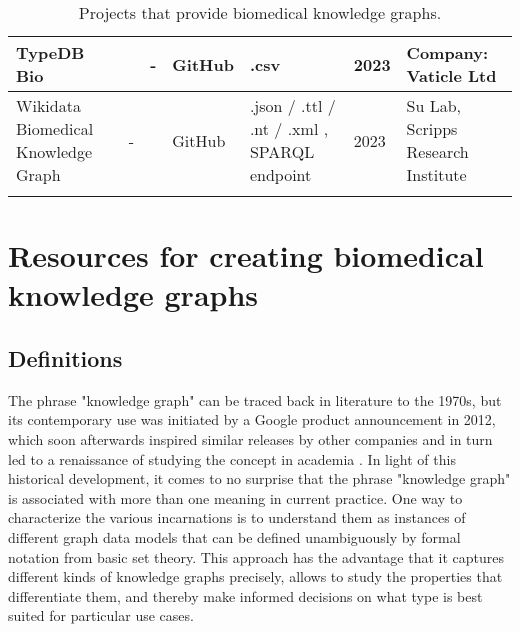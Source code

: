 \documentclass{article}
\begin{document}
\begin{landscape}
\begin{xltabular}{\textwidth}{p{3cm}|p{2.2cm}|p{2.2cm}|p{2.2cm}|p{2.2cm}|p{1cm}|p{6cm}}
\hline


TypeDB Bio
&
\cite{typedbbio_website}
&
-
&
GitHub
\cite{typedbbio_github}
&
.csv
\cite{typedbbio_data}
&
2023
&
Company: Vaticle Ltd
\cite{typedbbio_group}
\\


\hline


Wikidata Biomedical Knowledge Graph
&
-
&
\cite{wbkg_publication}
&
GitHub
\cite{wbkg_github1}
\cite{wbkg_github2}
\cite{wbkg_github3}
\cite{wbkg_github4}
\cite{wbkg_github5}
&
.json / .ttl / .nt / .xml
\cite{wbkg_data1},
SPARQL endpoint
\cite{wbkg_data2}
&
2023
&
Su Lab, Scripps Research Institute
\cite{wbkg_group}
\\


\caption{Projects that provide biomedical knowledge graphs.}
\end{xltabular}

\end{landscape}





\newpage
\section{Resources for creating biomedical knowledge graphs}
\label{sec:resources}

\subsection{Definitions}
\label{sec:definitions}

The phrase "knowledge graph" can be traced back in literature to the 1970s, but its contemporary use was initiated by a Google product announcement in 2012, which soon afterwards inspired similar releases by other companies and in turn led to a renaissance of studying the concept in academia \cite{hogan2021}. In light of this historical development, it comes to no surprise that the phrase "knowledge graph" is associated with more than one meaning in current practice. One way to characterize the various incarnations is to understand them as instances of different graph data models that can be defined unambiguously by formal notation from basic set theory. This approach has the advantage that it captures different kinds of knowledge graphs precisely, allows to study the properties that differentiate them, and thereby make informed decisions on what type is best suited for particular use cases.
\end{document}
